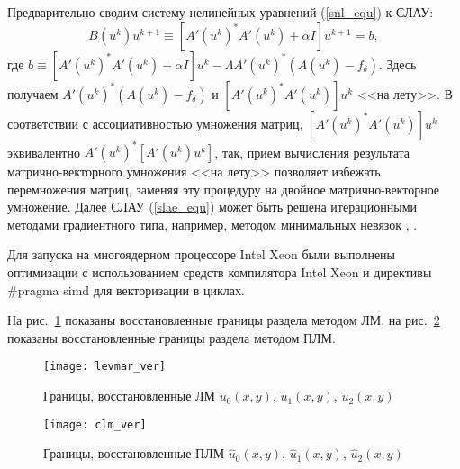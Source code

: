 Предварительно сводим систему нелинейных уравнений (\ref{snl_equ}) к СЛАУ:
\begin{equation}\label{slae_equ}
B(u^k)u^{k+1}\equiv[A'(u^k)^*A'(u^k)+\alpha I]u^{k+1}=b,
\end{equation}
где $b\equiv[A'(u^k)^*A'(u^k)+\alpha I]u^k-\Lambda A'(u^k)^*(A(u^k)-f_\delta)$. Здесь получаем  $A'(u^k)^*(A(u^k)-f_\delta)$ и $[A'(u^k)^*A'(u^k)]u^k$ <<на лету>>. В соответствии с ассоциативностью умножения матриц, $[A'(u^k)^*A'(u^k)]u^k$ эквивалентно $A'(u^k)^*[A'(u^k)u^k]$, так, прием вычисления результата матрично-векторного умножения <<на лету>> позволяет избежать перемножения матриц, заменяя эту процедуру на двойное матрично-векторное умножение. Далее СЛАУ (\ref{slae_equ}) может быть решена итерационными методами градиентного типа, например, методом минимальных невязок  \cite{VasEre2009}, \cite{BachZhid1987}.

Для запуска на многоядерном процессоре Intel Xeon были выполнены оптимизации с использованием средств компилятора Intel Xeon и директивы \#pragma simd для векторизации в циклах.

На рис.~\ref{fig:levmar} показаны восстановленные границы раздела методом ЛМ, на рис.~\ref{fig:clm} показаны восстановленные границы раздела методом ПЛМ.
\begin{figure}[H]
	\centering
	\texttt{[image: levmar\_ver]}
	\caption{Границы, восстановленные ЛМ $\tilde{u}_0(x,y)$, $\tilde{u}_1(x,y)$, $\tilde{u}_2(x,y)$}
	\label{fig:levmar}
\end{figure}
\begin{figure}[H]
	\centering
	\texttt{[image: clm\_ver]}
	\caption{Границы, восстановленные ПЛМ $\hat{u}_0(x,y)$, $\hat{u}_1(x,y)$, $\hat{u}_2(x,y)$}
	\label{fig:clm}
\end{figure}

